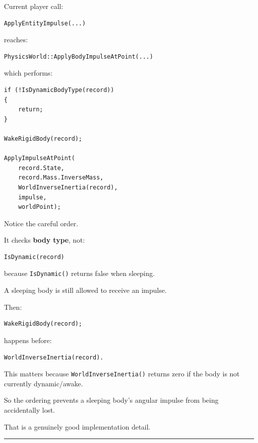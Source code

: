 \hypertarget{06-engine-ii-ch037-kairo-deep-audit-impulse-application-order}{}

Current player call:

\begin{verbatim}
ApplyEntityImpulse(...)
\end{verbatim}

reaches:

\begin{verbatim}
PhysicsWorld::ApplyBodyImpulseAtPoint(...)
\end{verbatim}

which performs:

\begin{verbatim}
if (!IsDynamicBodyType(record))
{
    return;
}

WakeRigidBody(record);

ApplyImpulseAtPoint(
    record.State,
    record.Mass.InverseMass,
    WorldInverseInertia(record),
    impulse,
    worldPoint);
\end{verbatim}

Notice the careful order.

It checks \textbf{body type}, not:

\begin{verbatim}
IsDynamic(record)
\end{verbatim}

because \texttt{IsDynamic()} returns false when sleeping.

A sleeping body is still allowed to receive an impulse.

Then:

\begin{verbatim}
WakeRigidBody(record);
\end{verbatim}

happens before:

\begin{verbatim}
WorldInverseInertia(record).
\end{verbatim}

This matters because \texttt{WorldInverseInertia()} returns zero if the body is not currently dynamic/awake.

So the ordering prevents a sleeping body's angular impulse from being accidentally lost.

That is a genuinely good implementation detail.

\begin{center}\rule{0.5\linewidth}{0.5pt}\end{center}

